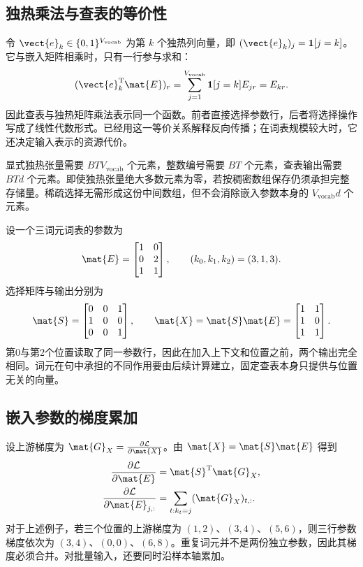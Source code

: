 \documentclass[../textbook.tex]{subfiles}
\begin{document}
\subsection{独热乘法与查表的等价性}
令 $\vect{e}_k\in\{0,1\}^{V_{\mathrm{vocab}}}$ 为第 $k$ 个独热列向量，即 $(\vect{e}_k)_j=\mathbf1[j=k]$。它与嵌入矩阵相乘时，只有一行参与求和：
\begin{equation}
 (\vect{e}_k^{\mathrm{T}}\mat{E})_r
 =\sum_{j=1}^{V_{\mathrm{vocab}}}\mathbf1[j=k]E_{jr}=E_{kr}.
\end{equation}
因此查表与独热矩阵乘法表示同一个函数。前者直接选择参数行，后者将选择操作写成了线性代数形式。已经用这一等价关系解释反向传播；在词表规模较大时，它还决定输入表示的资源代价。

显式独热张量需要 $BTV_{\mathrm{vocab}}$ 个元素，整数编号需要 $BT$ 个元素，查表输出需要 $BTd$ 个元素。即使独热张量绝大多数元素为零，若按稠密数组保存仍须承担完整存储量。稀疏选择无需形成这份中间数组，但不会消除嵌入参数本身的 $V_{\mathrm{vocab}}d$ 个元素。

\begin{example}[三词元嵌入查表]
设一个三词元词表的参数为
\begin{equation*}
 \mat{E}=\begin{bmatrix}1&0\\0&2\\1&1\end{bmatrix},\qquad
 (k_0,k_1,k_2)=(3,1,3).
\end{equation*}
选择矩阵与输出分别为
\begin{equation*}
 \mat{S}=\begin{bmatrix}0&0&1\\1&0&0\\0&0&1\end{bmatrix},\qquad
 \mat{X}=\mat{S}\mat{E}=\begin{bmatrix}1&1\\1&0\\1&1\end{bmatrix}.
\end{equation*}
第0与第2个位置读取了同一参数行，因此在加入上下文和位置之前，两个输出完全相同。词元在句中承担的不同作用要由后续计算建立，固定查表本身只提供与位置无关的向量。
\end{example}

\subsection{嵌入参数的梯度累加}
设上游梯度为 $\mat{G}_X=\frac{\partial\mathcal L}{\partial \mat{X}}$。由 $\mat{X}=\mat{S}\mat{E}$ 得到
\begin{equation}\label{eq:repr-embedding-grad}
 \begin{aligned}
  \frac{\partial\mathcal L}{\partial \mat{E}}&=\mat{S}^{\mathrm{T}}\mat{G}_X,\\
  \frac{\partial\mathcal L}{\partial \mat{E}_{j,:}}&=\sum_{t:k_t=j}(\mat{G}_X)_{t,:}.
 \end{aligned}
\end{equation}
对于上述例子，若三个位置的上游梯度为 $(1,2)$、$(3,4)$、$(5,6)$，则三行参数梯度依次为 $(3,4)$、$(0,0)$、$(6,8)$。重复词元并不是两份独立参数，因此其梯度必须合并。对批量输入，还要同时沿样本轴累加。
\end{document}
